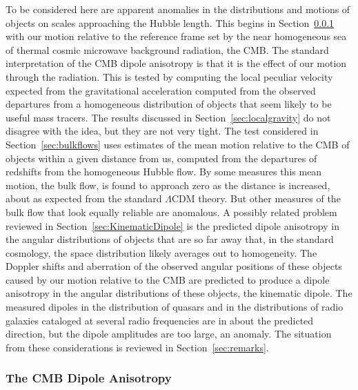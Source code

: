 \documentclass[fleqn,12pt]{article}
\begin{document}
To be considered here are apparent anomalies in the distributions and motions of objects on scales approaching the Hubble length. This begins in Section~\ref{sec:CMBDipole} with our motion relative to the reference frame set by the near homogeneous sea of thermal cosmic microwave background radiation, the CMB. The standard interpretation of the CMB dipole anisotropy is that it is the effect of our motion through the radiation. This is tested by computing the local peculiar velocity expected from the gravitational acceleration computed from the observed departures from a homogeneous distribution of objects that seem likely to be useful mass tracers. The results discussed in Section~\ref{sec:localgravity} do not disagree with the idea, but they are not very tight. The test considered in Section~\ref{sec:bulkflows} uses estimates of the mean motion relative to the CMB of objects within a given distance from us, computed from the departures of redshifts from the homogeneous Hubble flow. By some measures this mean motion, the bulk flow, is found to approach zero as the distance is increased, about as expected from the standard $\Lambda$CDM theory. But other measures of the bulk flow that look equally reliable are anomalous. A possibly related problem reviewed in Section~\ref{sec:KinematicDipole} is the predicted dipole anisotropy in the angular distributions of objects that are so far away that, in the standard cosmology, the space distribution likely averages out to homogeneity. The Doppler shifts and aberration of the observed angular positions of these objects caused by our motion relative to the CMB are predicted to produce a dipole anisotropy in the angular distributions of these objects, the kinematic dipole. The measured dipoles in the distribution of quasars and in the distributions of radio galaxies cataloged at several radio frequencies are in about the predicted direction, but the dipole amplitudes are too large, an anomaly. The situation from these considerations is reviewed in Section~\ref{sec:remarks}.

\subsubsection{The CMB Dipole Anisotropy}\label{sec:CMBDipole}
\end{document}
